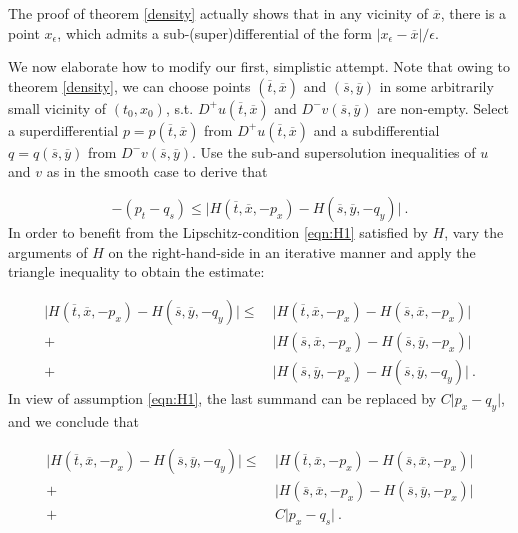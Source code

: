 	\begin{remark}
		\label{special_differentials}
		The proof of theorem \ref{density} actually shows that in any vicinity of $ \overline{x} $, there is a point $ x_{\epsilon} $, which admits a sub-(super)differential of the form $ \lvert x_{\epsilon} - \overline{x} \rvert / \epsilon $.
	\end{remark}
	
		We now elaborate how to modify our first, simplistic attempt. Note that owing to theorem \ref{density}, we can choose points $ (\overline{t}, \overline{x}) $ and $ (\overline{s}, \overline{y}) $ in some arbitrarily small vicinity of $ (t_0, x_0) $, s.t. $ D^{+}u(\overline{t}, \overline{x}) $ and $ D^{-}v(\overline{s}, \overline{y}) $ are non-empty. Select a superdifferential $ p = p(\overline{t}, \overline{x}) $ from $D^{+}u(\overline{t}, \overline{x}) $ and a subdifferential $ q = q(\overline{s}, \overline{y}) $ from $ D^{-}v(\overline{s}, \overline{y}) $. Use the sub-and supersolution inequalities of $ u $ and $ v $ as in the smooth case to derive that
		
		\begin{equation*}
			-(p_t - q_s) \leq \lvert H(\overline{t}, \overline{x}, -p_x) - H(\overline{s}, \overline{y}, -q_y) \rvert \ .
		\end{equation*}
		In order to benefit from the Lipschitz-condition \eqref{eqn:H1} satisfied by $ H $, vary the arguments of $ H $ on the right-hand-side in an iterative manner and apply the triangle inequality to obtain the estimate:
		
		\begin{equation*}
			\begin{split}
			\lvert H(\overline{t}, \overline{x}, -p_x) - H(\overline{s}, \overline{y}, -q_y) \rvert \leq \
			&\lvert H(\overline{t}, \overline{x}, -p_x) - H(\overline{s}, \overline{x}, -p_x) \rvert \\
			+&\lvert H(\overline{s}, \overline{x}, -p_x) - H(\overline{s}, \overline{y}, -p_x) \rvert \\
			+&\lvert H(\overline{s}, \overline{y}, -p_x) - H(\overline{s}, \overline{y}, -q_y) \rvert \ .
			\end{split} 
		\end{equation*}
		In view of assumption \eqref{eqn:H1}, the last summand can be replaced by $ C \lvert p_x - q_y \rvert $, and we conclude that
		
		\begin{equation}
			\label{idea}
			\begin{split}
			\lvert H(\overline{t}, \overline{x}, -p_x) - H(\overline{s}, \overline{y}, -q_y) \rvert \leq \
			&\lvert H(\overline{t}, \overline{x}, -p_x) - H(\overline{s}, \overline{x}, -p_x) \rvert \\
			+&\lvert H(\overline{s}, \overline{x}, -p_x) - H(\overline{s}, \overline{y}, -p_x) \rvert \\
			+& C \lvert p_x - q_s \rvert \ .
			\end{split}
		\end{equation}
		
